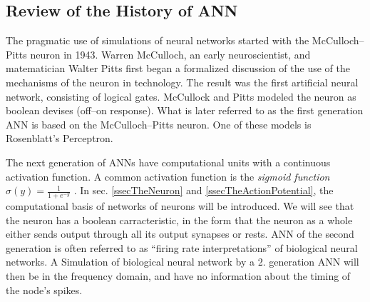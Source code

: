 
\subsection{Review of the History of ANN}
\label{ssecHistoryOfANN}
The pragmatic use of simulations of neural networks started with the McCulloch--Pitts neuron in 1943. 
Warren McCulloch, an early neuroscientist, and matematician Walter Pitts first began a formalized discussion of the use of the mechanisms of the neuron in technology. %
The result was the first artificial neural network, consisting of logical gates. McCullock and Pitts modeled the neuron as boolean devises (off--on response)\cite{MccullochPittsHistorie}. 
What is later referred to as the first generation ANN is based on the McCulloch--Pitts neuron\cite{Maass97networksof}.
One of these models is Rosenblatt's Perceptron\cite{HaykinANNbok}.

The next generation of ANNs have computational units with a continuous activation function. 
A common activation function is the \emph{sigmoid function} $\sigma(y)=\frac{1}{1+e^{-y}}$ \cite{HaykinANNbok}.
In sec. \ref{ssecTheNeuron} and \ref{ssecTheActionPotential}, the computational basis of networks of neurons will be introduced. 
We will see that the neuron has a boolean carracteristic, in the form that the neuron as a whole either sends output through all its output synapses or rests. 
%
ANN of the second generation is often referred to as ``firing rate interpretations'' of biological neural networks\cite{Maass97networksof}.
A Simulation of biological neural network by a 2. generation ANN will then be in the frequency domain, and have no information about the timing of the node's spikes.



